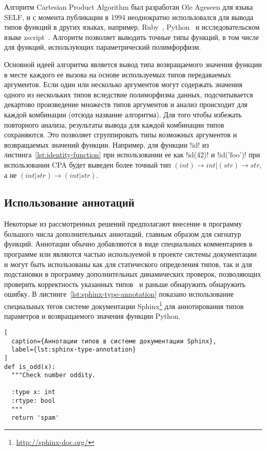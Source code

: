 Алгоритм Cartesian Product Algorithm был разработан Ole Ageseen для языка SELF,
и с момента публикации в 1994 неоднократно использовался для вывода типов функций в
других языках, например, Ruby~\cite{Madsen2007}, Python~\cite{Salib2004} и
исследовательском языке zscript~\cite{Hanov}. Алгоритм позволяет выводить точные
типы функций, в том числе для функций, использующих параметрический полимфорфизм.

Основной идеей алгоритма является вывод типа возвращаемого значения функции в
месте каждого ее вызова на основе используемых типов передаваемых аргументов.
Если один или несколько аргументов могут содержать значения одного из нескольких
типов вследствие полиморфизма данных, подсчитывается декартово произведение
множеств типов аргументов и анализ происходит для каждой комбинации (отсюда
название алгоритма). Для того чтобы избежать повторного анализа, результаты
вывода для каждой комбинации типов сохраняются. Это позволяет сгруппировать типы
возможных аргументов и возвращаемых значений функции. Например, для функции !id!
из листинга~\ref{lst:identity-function} при использовании ее как !id(42)!  и
!id('foo')! при использовании CPA будет выведен более точный тип $(int)
\rightarrow int | (str) \rightarrow str$, а не $(int | str) \rightarrow (int |
str)$.

\subsection{Использование аннотаций}

Некоторые из рассмотренных решений предполагают внесение в программу большого
числа дополнительных аннотаций, главным образом для сигнатур функций. Аннотации
обычно добавляются в виде специальных комментариев в программе или являются
частью используемой в проекте системы документации и могут быть использованы
как для статического определения типов, так и для подстановки в программу
дополнительных динамических проверок, позволяющих проверить 
корректность указанных типов~\cite{Furr2009} и раньше обнаружить обнаружить
ошибку. В листинге~\ref{lst:sphinx-type-annotation} показано использование
специальных тегов системе документации
Sphinx\footnote{\url{http://sphinx-doc.org/}} для аннотирования типов параметров
и возвращаемого значения функции Python.

\begin{lstlisting}[
  caption={Аннотации типов в системе документации Sphinx},
  label={lst:sphinx-type-annotation}
]
def is_odd(x):
  """Check number oddity.

  :type x: int
  :rtype: bool
  """
  return 'spam'
\end{lstlisting}

